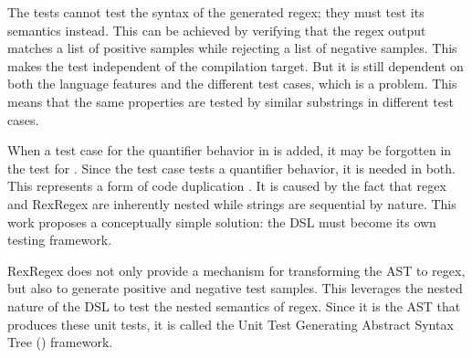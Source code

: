 The tests cannot test the syntax of the generated regex; they must test its semantics instead. This can be achieved by verifying that the regex output matches a list of positive samples while rejecting a list of negative samples. This makes the test independent of the compilation target. But it is still dependent on both the language features and the different test cases, which is a problem. This means that the same properties are tested by similar substrings in different test cases. 

When a test case for the quantifier behavior in  is added, it may be forgotten in the test for . Since the test case tests a quantifier behavior, it is needed in both. This represents a form of code duplication \cite[p.~4]{refactoring}. It is caused by the fact that regex and RexRegex are inherently nested while strings are sequential by nature. This work proposes a conceptually simple solution: the DSL must become its own testing framework.

RexRegex does not only provide a mechanism for transforming the AST to regex, but also to generate positive and negative test samples. This leverages the nested nature of the DSL to test the nested semantics of regex. Since it is the AST that produces these unit tests, it is called the Unit Test Generating Abstract Syntax Tree (\utgast{}) framework.

